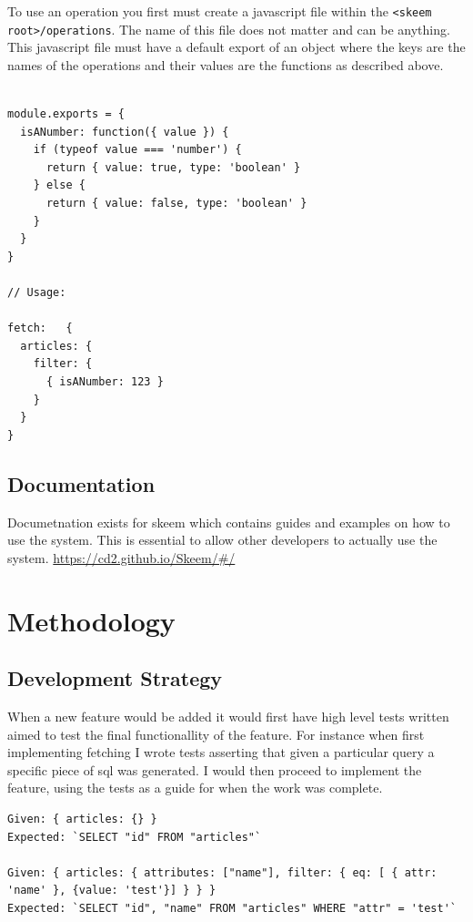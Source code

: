 \documentclass[
  12pt,
]{article}
\newcommand{\passthrough}[1]{#1}
\begin{document}
To use an operation you first must create a javascript file within the
\passthrough{\lstinline!<skeem root>/operations!}. The name of this file
does not matter and can be anything. This javascript file must have a
default export of an object where the keys are the names of the
operations and their values are the functions as described above.

\begin{lstlisting}[caption={A full operation plugin file}]

module.exports = {
  isANumber: function({ value }) {
    if (typeof value === 'number') {
      return { value: true, type: 'boolean' }
    } else {
      return { value: false, type: 'boolean' }
    }
  }
}

// Usage:

fetch:   {
  articles: {
    filter: {
      { isANumber: 123 }
    }
  }
}
\end{lstlisting}

\hypertarget{documentation}{%
\subsection{Documentation}\label{documentation}}

Documetnation exists for skeem which contains guides and examples on how
to use the system. This is essential to allow other developers to
actually use the system. \url{https://cd2.github.io/Skeem/\#/}

\hypertarget{methodology}{%
\section{Methodology}\label{methodology}}

\hypertarget{development-strategy}{%
\subsection{Development Strategy}\label{development-strategy}}

When a new feature would be added it would first have high level tests
written aimed to test the final functionallity of the feature. For
instance when first implementing fetching I wrote tests asserting that
given a particular query a specific piece of sql was generated. I would
then proceed to implement the feature, using the tests as a guide for
when the work was complete.

\begin{lstlisting}[caption={Example of what the high level tests would assert (not actual tests)}]
Given: { articles: {} }
Expected: `SELECT "id" FROM "articles"`

Given: { articles: { attributes: ["name"], filter: { eq: [ { attr: 'name' }, {value: 'test'}] } } }
Expected: `SELECT "id", "name" FROM "articles" WHERE "attr" = 'test'`
\end{lstlisting}
\end{document}
